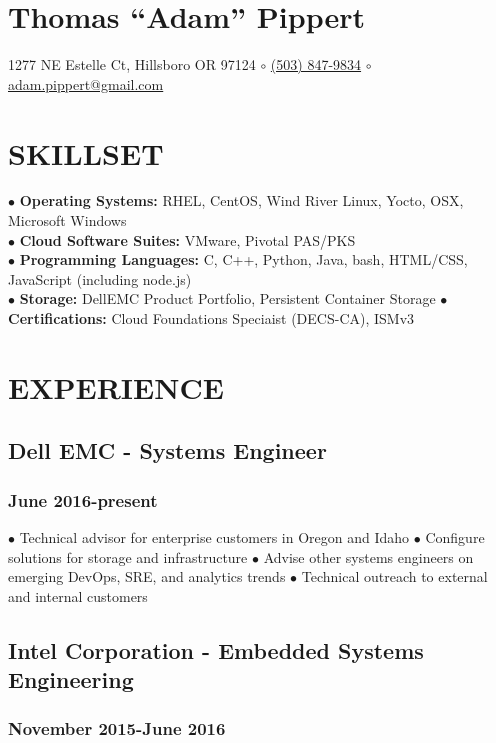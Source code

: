 \documentclass{article}
\begin{document}
\section*{Thomas ``Adam'' Pippert}
1277 NE Estelle Ct, Hillsboro OR 97124 $\circ$
\href{tel:+15038479834}{(503) 847-9834} $\circ$
\href{mailto:adam.pippert@gmail.com}{adam.pippert@gmail.com}

\section*{SKILLSET}


$\bullet$ \textbf{Operating Systems:} RHEL, CentOS, Wind River Linux, Yocto, OSX, Microsoft Windows\\
$\bullet$ \textbf{Cloud Software Suites:} VMware, Pivotal PAS/PKS\\
$\bullet$ \textbf{Programming Languages:} C, C++, Python, Java, bash, HTML/CSS, JavaScript (including node.js)\\
$\bullet$ \textbf{Storage:} DellEMC Product Portfolio, Persistent Container Storage
$\bullet$ \textbf{Certifications:} Cloud Foundations Speciaist (DECS-CA), ISMv3 


\section*{EXPERIENCE}

\subsection*{Dell EMC - Systems Engineer}
\subsubsection*{June 2016-present}

$\bullet$ Technical advisor for enterprise customers in Oregon and Idaho
$\bullet$ Configure solutions for storage and infrastructure
$\bullet$ Advise other systems engineers on emerging DevOps, SRE, and analytics trends
$\bullet$ Technical outreach to external and internal customers

\subsection*{Intel Corporation - Embedded Systems Engineering}
\subsubsection*{November 2015-June 2016}
\end{document}
